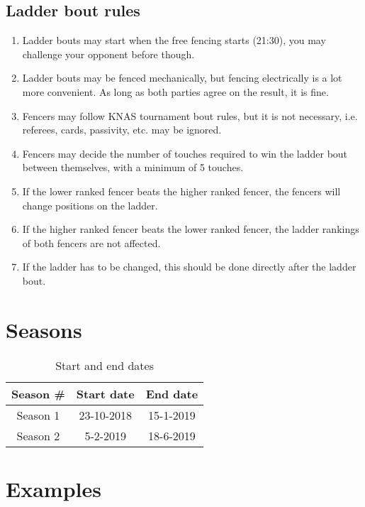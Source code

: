 \documentclass{article}
\begin{document}
\subsection{Ladder bout rules}
\begin{enumerate}
    \item Ladder bouts may start when the free fencing starts (21:30), you may challenge your opponent before though.
    \item Ladder bouts may be fenced mechanically, but fencing electrically is a lot more convenient. As long as both parties agree on the result, it is fine.
    \item Fencers may follow KNAS tournament bout rules, but it is not necessary, i.e. referees, cards, passivity, etc. may be ignored.
    \item Fencers may decide the number of touches required to win the ladder bout between themselves, with a minimum of 5 touches.
    \item If the lower ranked fencer beats the higher ranked fencer, the fencers will change positions on the ladder.
    \item If the higher ranked fencer beats the lower ranked fencer, the ladder rankings of both fencers are not affected.
    \item If the ladder has to be changed, this should be done directly after the ladder bout.
\end{enumerate}
\section{Seasons}
\begin{table}[ht]
    \centering
    \begin{tabular}{|c|c|c|}
        \hline
        Season \# & Start date & End date \\ \hline
        Season 1 & 23-10-2018 & 15-1-2019 \\ \hline
        Season 2 & 5-2-2019 & 18-6-2019 \\ \hline
    \end{tabular}
    \caption{Start and end dates}
    \label{tab:dates}
\end{table}
\section{Examples}
\end{document}
